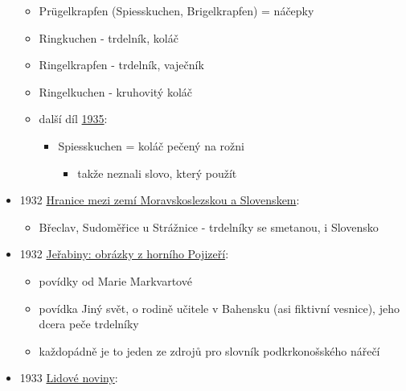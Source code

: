 \begin{itemize}
  \begin{itemize}
  \tightlist
  \item
    Prügelkrapfen (Spiesskuchen, Brigelkrapfen) = náčepky
  \item
    Ringkuchen - trdelník, koláč
  \item
    Ringelkrapfen - trdelník, vaječník
  \item
    Ringelkuchen - kruhovitý koláč
  \item
    další díl
    \href{https://ceskadigitalniknihovna.cz/uuid/uuid:83ae629b-8a1b-4b33-a2cb-0141786babd8}{1935}:

    \begin{itemize}
    \tightlist
    \item
      Spiesskuchen = koláč pečený na rožni

      \begin{itemize}
      \tightlist
      \item
        takže neznali slovo, který použít
      \end{itemize}
    \end{itemize}
  \end{itemize}
\item
  1932
  \href{https://ceskadigitalniknihovna.cz/view/uuid:60ab056c-5ee1-43ab-9014-e91189880750?page=uuid\%3A31d79ba8-8100-11ed-8b6a-001b63bd97ba&fulltext=trd*&source=kfbz}{Hranice
  mezi zemí Moravskoslezskou a Slovenskem}:

  \begin{itemize}
  \tightlist
  \item
    Břeclav, Sudoměřice u Strážnice - trdelníky se smetanou, i Slovensko
  \end{itemize}
\item
  1932
  \href{https://www.digitalniknihovna.cz/mzk/view/uuid:ea5d2d20-0652-11e8-b1a1-005056827e52?page=uuid\%3A58510a10-3f36-11e8-a7aa-005056825209&fulltext=trdeln\%C3\%ADk}{Jeřabiny:
  obrázky z horního Pojizeří}:

  \begin{itemize}
  \tightlist
  \item
    povídky od Marie Markvartové
  \item
    povídka Jiný svět, o rodině učitele v Bahensku (asi fiktivní
    vesnice), jeho dcera peče trdelníky
  \item
    každopádně je to jeden ze zdrojů pro slovník podkrkonošského nářečí
  \end{itemize}
\item
  1933
  \href{https://ceskadigitalniknihovna.cz/view/uuid:1026bc40-ea8b-11dc-9dcb-000d606f5dc6?page=uuid\%3Ac347cf40-31ff-4912-b767-a8cb9e4e8683&fulltext=trdeln*&source=nkp}{Lidové
  noviny}:


\end{itemize}
